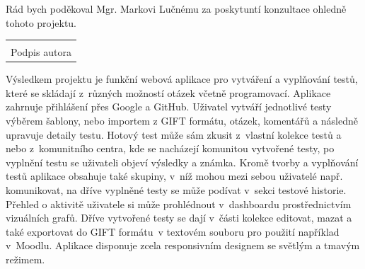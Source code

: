 \documentclass[12pt, a4paper,
openright
]{report}
\newcommand\datumOdevzdani{1. 1. 2024} %
\begin{document}
\cleardoublepage %
	

	
	\noindent Rád bych poděkoval Mgr. Markovi Lučnému za poskytuntí konzultace ohledně tohoto projektu.
	
	\vspace*{0.7\textheight} %

	\vfill
	\noindent{V Opavě \datumOdevzdani\\}
	\noindent
	\begin{minipage}{\linewidth}
		\hspace{9.5cm} 
		\begin{tabular}{@{}p{6cm}@{}}
			\dotfill \\
			Podpis autora
		\end{tabular}
	\end{minipage}
	
	\cleardoublepage %


	\noindent Výsledkem projektu je funkční webová aplikace pro vytváření a vyplňování testů, které se skládají z~různých možností otázek včetně programovací. Aplikace zahrnuje přihlášení přes Google a GitHub. Uživatel vytváří jednotlivé testy výběrem šablony, nebo importem z GIFT formátu, otázek, komentářů a následně upravuje detaily testu. Hotový test může sám zkusit z~vlastní kolekce testů a nebo z~komunitního centra, kde se nacházejí komunitou vytvořené testy, po vyplnění testu se uživateli objeví výsledky a známka. Kromě tvorby a vyplňování testů aplikace obsahuje také skupiny, v~níž mohou mezi sebou uživatelé např. komunikovat, na dříve vyplněné testy se může podívat v~sekci testové historie. Přehled o aktivitě uživatele si může prohlédnout v~dashboardu prostřednictvím vizuálních grafů. Dříve vytvořené testy se dají v~části kolekce editovat, mazat a také exportovat do GIFT formátu~v textovém souboru pro použití například v~Moodlu. Aplikace disponuje zcela responsivním designem se světlým a tmavým režimem.
	
\end{document}
